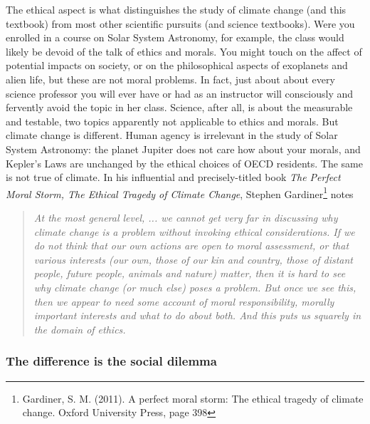 \documentclass[amstex,12pt]{book}
\begin{document}
The ethical aspect is what distinguishes the study of climate change (and this textbook) from most other scientific pursuits (and science textbooks). Were you enrolled in a course on Solar System Astronomy, for example, the class would likely be devoid of the talk of ethics and morals. You might touch on the affect of potential impacts on society, or on the philosophical aspects of exoplanets and alien life, but these are not moral problems. In fact, just about about every science professor you will ever have or had as an instructor will consciously and fervently avoid the topic in her class. Science, after all, is about the measurable and testable, two topics apparently not applicable to ethics and morals. But climate change is different. Human agency is irrelevant in the study of Solar System Astronomy: the planet Jupiter does not care how about your morals, and Kepler's Laws are unchanged by the ethical choices of OECD residents. The same is not true of climate. In his influential and precisely-titled book \textit{The Perfect Moral Storm, The Ethical Tragedy of Climate Change}, Stephen Gardiner\footnote{Gardiner, S. M. (2011). A perfect moral storm: The ethical tragedy of climate change. Oxford University Press, page 398} notes

\begin{quotation}\noindent\textit{At the most general level, ... we cannot get very far in discussing why climate change is a problem without invoking ethical considerations. If we do not think that our own actions are open to moral assessment, or that various interests (our own, those of our kin and country, those of distant people, future people, animals and nature) matter, then it is hard to see why climate change (or much else) poses a problem. But once we see this, then we appear to need some account of moral responsibility, morally important interests and what to do about both. And this puts us squarely in the domain of ethics.}
\end{quotation}
 
\subsubsection{The difference is the social dilemma}\label{Prisoners_D}
\end{document}
